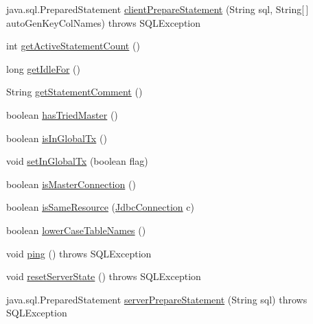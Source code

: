 \begin{DoxyCompactItemize}
\item 
java.\+sql.\+Prepared\+Statement \mbox{\hyperlink{interfacecom_1_1mysql_1_1cj_1_1jdbc_1_1_jdbc_connection_a46a218367bb0a386a18caed711142d7a}{client\+Prepare\+Statement}} (String sql, String\mbox{[}$\,$\mbox{]} auto\+Gen\+Key\+Col\+Names)  throws S\+Q\+L\+Exception
\item 
int \mbox{\hyperlink{interfacecom_1_1mysql_1_1cj_1_1jdbc_1_1_jdbc_connection_aea218879f6bae7ed7717a257876582db}{get\+Active\+Statement\+Count}} ()
\item 
long \mbox{\hyperlink{interfacecom_1_1mysql_1_1cj_1_1jdbc_1_1_jdbc_connection_a3a242d2fb1e6c443f163d55f8bbd6cde}{get\+Idle\+For}} ()
\item 
String \mbox{\hyperlink{interfacecom_1_1mysql_1_1cj_1_1jdbc_1_1_jdbc_connection_a11233536b54479183feb8eda938f72e9}{get\+Statement\+Comment}} ()
\item 
boolean \mbox{\hyperlink{interfacecom_1_1mysql_1_1cj_1_1jdbc_1_1_jdbc_connection_ab7d858b77e30de81f7ec67504ba89b0c}{has\+Tried\+Master}} ()
\item 
boolean \mbox{\hyperlink{interfacecom_1_1mysql_1_1cj_1_1jdbc_1_1_jdbc_connection_a919152df37a4bf60c12c0818256a90a3}{is\+In\+Global\+Tx}} ()
\item 
void \mbox{\hyperlink{interfacecom_1_1mysql_1_1cj_1_1jdbc_1_1_jdbc_connection_af7cff3ba67d2b787b04c3eff40f9e087}{set\+In\+Global\+Tx}} (boolean flag)
\item 
boolean \mbox{\hyperlink{interfacecom_1_1mysql_1_1cj_1_1jdbc_1_1_jdbc_connection_a012dc133872dd4d6db6d6f98118d3251}{is\+Master\+Connection}} ()
\item 
boolean \mbox{\hyperlink{interfacecom_1_1mysql_1_1cj_1_1jdbc_1_1_jdbc_connection_a90906591d933e0d9f10dbb9db6b5a83a}{is\+Same\+Resource}} (\mbox{\hyperlink{interfacecom_1_1mysql_1_1cj_1_1jdbc_1_1_jdbc_connection}{Jdbc\+Connection}} c)
\item 
boolean \mbox{\hyperlink{interfacecom_1_1mysql_1_1cj_1_1jdbc_1_1_jdbc_connection_a54cca6407a1a531b8e65ee3d965a51cd}{lower\+Case\+Table\+Names}} ()
\item 
void \mbox{\hyperlink{interfacecom_1_1mysql_1_1cj_1_1jdbc_1_1_jdbc_connection_a6d078258f83ddc438d64bafb0f665004}{ping}} ()  throws S\+Q\+L\+Exception
\item 
void \mbox{\hyperlink{interfacecom_1_1mysql_1_1cj_1_1jdbc_1_1_jdbc_connection_a44456aec7737354a14eff20638c047fa}{reset\+Server\+State}} ()  throws S\+Q\+L\+Exception
\item 
java.\+sql.\+Prepared\+Statement \mbox{\hyperlink{interfacecom_1_1mysql_1_1cj_1_1jdbc_1_1_jdbc_connection_add415475386bd7577301fddbdd5518b8}{server\+Prepare\+Statement}} (String sql)  throws S\+Q\+L\+Exception

\end{DoxyCompactItemize}
